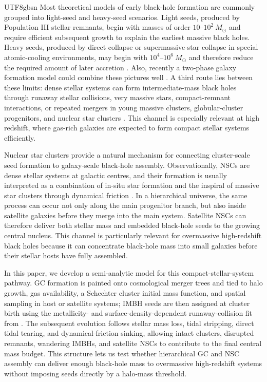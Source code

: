\documentclass[trackchanges, twocolappendix, twocolumn]{aastex701}
\begin{document}
\begin{CJK*}{UTF8}{gbsn}
Most theoretical models of early black-hole formation are commonly grouped into light-seed and heavy-seed scenarios. Light seeds, produced by Population III stellar remnants, begin with masses of order $10$--$10^2~M_\odot$ and require efficient subsequent growth to explain the earliest massive black holes. Heavy seeds, produced by direct collapse or supermassive-star collapse in special atomic-cooling environments, may begin with $10^4$--$10^6~M_\odot$ and therefore reduce the required amount of later accretion \citep{BrommLoeb2003, Begelman+2006, LodatoNatarajan2006, LatifFerrara2016}. Also, recently a two-phase galaxy formation model could combine these pictures well \citep{Mo+2024TwoGFM, Chen+2024TwoGFM, Chen+2025aTwoGFM, Chen+2025bTwoGFM}. A third route lies between these limits: dense stellar systems can form intermediate-mass black holes through runaway stellar collisions, very massive stars, compact-remnant interactions, or repeated mergers in young massive clusters, globular-cluster progenitors, and nuclear star clusters \citep{PortegiesZwartMcMillan2002, DevecchiVolonteri2009, Davies+2011, Rantala+2026}. This channel is especially relevant at high redshift, where gas-rich galaxies are expected to form compact stellar systems efficiently.

Nuclear star clusters provide a natural mechanism for connecting cluster-scale seed formation to galaxy-scale black-hole assembly. Observationally, NSCs are dense stellar systems at galactic centres, and their formation is usually interpreted as a combination of in-situ star formation and the inspiral of massive star clusters through dynamical friction \citep{Neumayer+2020}. In a hierarchical universe, the same process can occur not only along the main progenitor branch, but also inside satellite galaxies before they merge into the main system. Satellite NSCs can therefore deliver both stellar mass and embedded black-hole seeds to the growing central nucleus. This channel is particularly relevant for overmassive high-redshift black holes because it can concentrate black-hole mass into small galaxies before their stellar hosts have fully assembled.

In this paper, we develop a semi-analytic model for this compact-stellar-system pathway. GC formation is painted onto cosmological merger trees and tied to halo growth, gas availability, a Schechter cluster initial mass function, and spatial sampling in host or satellite systems; IMBH seeds are then assigned at cluster birth using the metallicity- and surface-density-dependent runaway-collision fit from \cite{Rantala+2026FROST}. The subsequent evolution follows stellar mass loss, tidal stripping, direct tidal tearing, and dynamical-friction sinking, allowing intact clusters, disrupted remnants, wandering IMBHs, and satellite NSCs to contribute to the final central mass budget. This structure lets us test whether hierarchical GC and NSC assembly can deliver enough black-hole mass to overmassive high-redshift systems without imposing seeds directly by a halo-mass threshold.


\end{CJK*}
\end{document}
